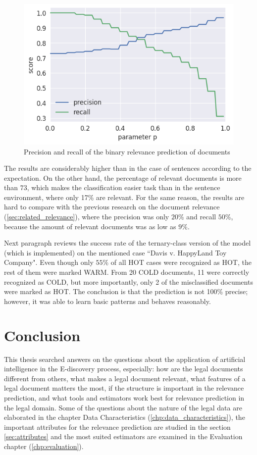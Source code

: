 \documentclass[
  digital, %
  notable,   %
  nolof,     %
  nolot,     %
]{fithesis3}
\begin{document}
\begin{figure}[H]
\caption{Precision and recall of the binary relevance prediction of documents}
\label{fig:doc_PR}
\includegraphics[width=\textwidth]{img/doc_PR}
\end{figure}

The results are considerably higher than in the case of sentences according to the expectation.
On the other hand, the percentage of relevant documents is more than $73$, which makes the classification easier task than in the sentence environment, where only 17\% are relevant.
For the same reason, the results are hard to compare with the previous research on the document relevance (\ref{sec:related_relevance}), where the precision was only $20\%$ and recall $50\%$, because the amount of relevant documents was as low as $9\%$.

Next paragraph reviews the success rate of the ternary-class version of the model (which is implemented) on the mentioned case ``Davis v. HappyLand Toy Company".
Even though only $55\%$ of all HOT cases were recognized as HOT, the rest of them were marked WARM.
From 20 COLD documents, 11 were correctly recognized as COLD, but more importantly, only 2 of the misclassified documents were marked as HOT.
The conclusion is that the prediction is not 100\% precise; however, it was able to learn basic patterns and behaves reasonably.

\chapter{Conclusion}
This thesis searched answers on the questions about the application of artificial intelligence in the E-discovery process, especially: how are the legal documents different from others, what makes a legal document relevant, what features of a legal document matters the most, if the structure is important in the relevance prediction, and what tools and estimators work best for relevance prediction in the legal domain.
Some of the questions about the nature of the legal data are elaborated in the chapter Data Characteristics (\ref{chp:data_characteristics}), the important attributes for the relevance prediction are studied in the section \ref{sec:attributes} and the most suited estimators are examined in the Evaluation chapter (\ref{chp:evaluation}).
\end{document}
